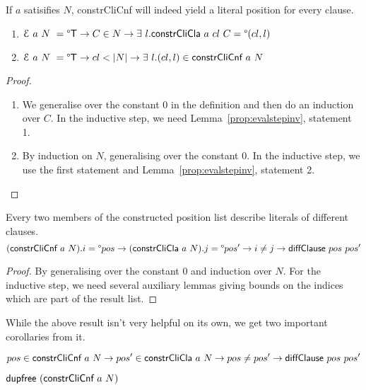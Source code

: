 \documentclass[a4paper,UKenglish,cleveref, autoref]{lipics-v2019}
\begin{document}
\begin{lemma} If $a$ satisifies $N$, \normalfont\textsf{constrCliCnf} will indeed yield a literal position for every clause. 
  \begin{enumerate}
    \item $\mathcal{E}~a~N~ = \degree\mathsf{T} \rightarrow C \in N \rightarrow \exists~l. \normalfont\textsf{constrCliCla}~a~cl~C = \degree(cl, l)$
    \item $\mathcal{E}~a~N~ = \degree\mathsf{T} \rightarrow cl < |N| \rightarrow \exists~l. (cl, l) \in \normalfont\textsf{constrCliCnf}~a~N $
  \end{enumerate}
\end{lemma}
\begin{proof}
  \begin{enumerate}
    \item We generalise over the constant 0 in the definition and then do an induction over $C$. In the inductive step, we need Lemma~\ref{prop:evalstepinv}, statement 1.
    \item By induction on $N$, generalising over the constant 0. In the inductive step, we use the first statement and Lemma~\ref{prop:evalstepinv}, statement 2. 
  \end{enumerate}
\end{proof}

\begin{lemma}
  Every two members of the constructed position list describe literals of different clauses.
  \[(\normalfont\textsf{constrCliCnf}~a~N).i = \degree pos \rightarrow (\normalfont\textsf{constrCliCla}~a~N).j = \degree pos' \rightarrow i \neq j \rightarrow \normalfont\textsf{diffClause}~pos~pos' \]
\end{lemma}
\begin{proof}
  By generalising over the constant 0 and induction over $N$. For the inductive step, we need several auxiliary lemmas giving bounds on the indices which are part of the result list.
\end{proof}

While the above result isn't very helpful on its own, we get two important corollaries from it.

\begin{corollary}
  \[ pos \in \normalfont\textsf{constrCliCnf}~a~N \rightarrow pos' \in \normalfont\textsf{constrCliCla}~a~N \rightarrow pos \neq pos' \rightarrow \normalfont\textsf{diffClause}~pos~pos' \]
\end{corollary}

\begin{corollary}
   $\normalfont\textsf{dupfree}~(\normalfont\textsf{constrCliCnf}~a~N)$
\end{corollary}
\end{document}
